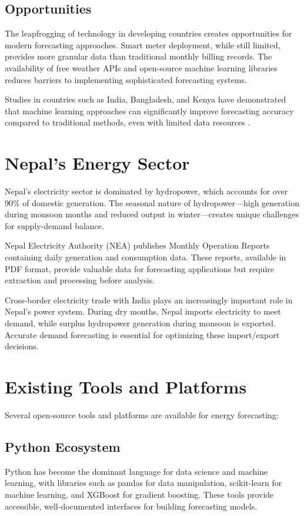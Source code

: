         \subsection{Opportunities}
        The leapfrogging of technology in developing countries creates opportunities for modern forecasting approaches. Smart meter deployment, while still limited, provides more granular data than traditional monthly billing records. The availability of free weather APIs and open-source machine learning libraries reduces barriers to implementing sophisticated forecasting systems.

        Studies in countries such as India, Bangladesh, and Kenya have demonstrated that machine learning approaches can significantly improve forecasting accuracy compared to traditional methods, even with limited data resources \cite{singh2012application, rahman2020electricity}.

    \section{Nepal's Energy Sector}
        Nepal's electricity sector is dominated by hydropower, which accounts for over 90\% of domestic generation. The seasonal nature of hydropower—high generation during monsoon months and reduced output in winter—creates unique challenges for supply-demand balance.

        Nepal Electricity Authority (NEA) publishes Monthly Operation Reports containing daily generation and consumption data. These reports, available in PDF format, provide valuable data for forecasting applications but require extraction and processing before analysis.

        Cross-border electricity trade with India plays an increasingly important role in Nepal's power system. During dry months, Nepal imports electricity to meet demand, while surplus hydropower generation during monsoon is exported. Accurate demand forecasting is essential for optimizing these import/export decisions.

    \section{Existing Tools and Platforms}
        Several open-source tools and platforms are available for energy forecasting:

        \subsection{Python Ecosystem}
        Python has become the dominant language for data science and machine learning, with libraries such as pandas for data manipulation, scikit-learn for machine learning, and XGBoost for gradient boosting. These tools provide accessible, well-documented interfaces for building forecasting models.

